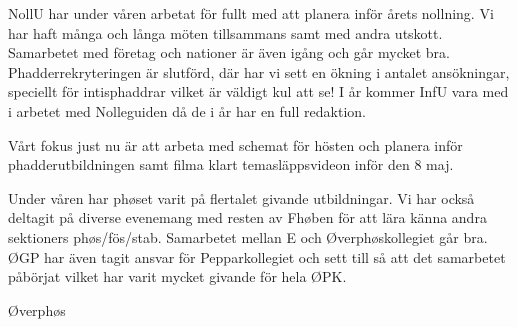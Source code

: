 \documentclass[../_main/handlingar.tex]{subfiles}
\begin{document}

NollU har under våren arbetat för fullt med att planera inför årets nollning. Vi har haft många och långa möten tillsammans samt med andra utskott. Samarbetet med företag och nationer är även igång och går mycket bra. Phadderrekryteringen är slutförd, där har vi sett en ökning i antalet ansökningar, speciellt för intisphaddrar vilket är väldigt kul att se! I år kommer InfU vara med i arbetet med Nolleguiden då de i år har en full redaktion.

Vårt fokus just nu är att arbeta med schemat för hösten och planera inför phadderutbildningen samt filma klart temasläppsvideon inför den 8 maj. 

Under våren har phøset varit på flertalet givande utbildningar. Vi har också deltagit på diverse evenemang med resten av Fhøben för att lära känna andra sektioners phøs/fös/stab. Samarbetet mellan E och Øverphøskollegiet går bra. ØGP har även tagit ansvar för Pepparkollegiet och sett till så att det samarbetet påbörjat vilket har varit mycket givande för hela ØPK.


\begin{signatures}{1}
    \mvh
    \signature{Stephanie Bol}{Øverphøs}
\end{signatures}
\end{document}
